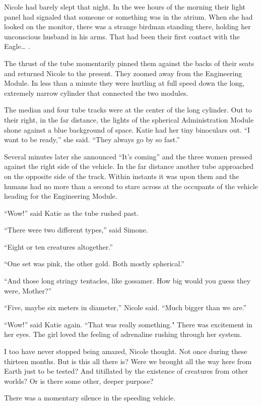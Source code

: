 \documentclass[]{article}
\begin{document}
{Nicole had barely slept that night.  In the wee hours of the morning their light panel had signaled that someone or something was in the atrium.  When she had looked on the monitor, there was a strange birdman standing there, holding her unconscious husband in his arms.  That had been their first contact with the Eagle… .

The thrust of the tube momentarily pinned them against the backs of their seats and returned Nicole to the present.  They zoomed away from the Engineering Module.  In less than a minute they were hurtling at full speed down the long, extremely narrow cylinder that connected the two modules.

The median and four tube tracks were at the center of the long cylinder.  Out to their right, in the far distance, the lights of the spherical Administration Module shone against a blue background of space.  Katie had her tiny binoculars out.  “I want to be ready,” she said.  “They always go by so fast.”

Several minutes later she announced “It’s coming” and the three women pressed against the right side of the vehicle.  In the far distance another tube approached on the opposite side of the track.  Within instants it was upon them and the humans had no more than a second to stare across at the occupants of the vehicle heading for the Engineering Module.

“Wow!” said Katie as the tube rushed past.

“There were two different types,” said Simone.

“Eight or ten creatures altogether.”

“One set was pink, the other gold.  Both mostly spherical.”

“And those long stringy tentacles, like gossamer.  How big would you guess they were, Mother?”

“Five, maybe six meters in diameter,” Nicole said.  “Much bigger than we are.”

“Wow!” said Katie again.  “That was really something."  There was excitement in her eyes.  The girl loved the feeling of adrenaline rushing through her system.

I too have never stopped being amazed, Nicole thought.  Not once during these thirteen months.  But is this all there is? Were we brought all the way here from Earth just to be tested? And titillated by the existence of creatures from other worlds? Or is there some other, deeper purpose?

There was a momentary silence in the speeding vehicle.

}
\end{document}
